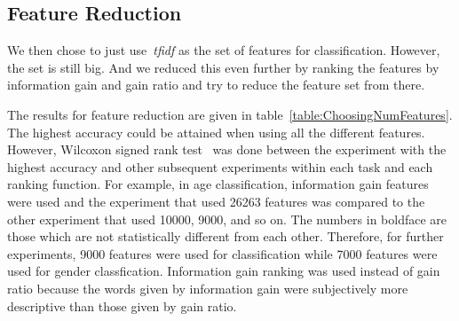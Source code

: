 \documentclass[a4paper]{llncs}
\begin{document}
\subsection{Feature Reduction}
We then chose to just use~\textit{tfidf} as the set of features for classification. However, the set is still big. And we reduced this even further by ranking the features by information gain and gain ratio and try to reduce the feature set from there.  

The results for feature reduction are given in table~\ref{table:ChoosingNumFeatures}. The highest accuracy could be attained when using all the different features. However, Wilcoxon signed rank test~\cite{wilcoxon1945individual} was done between the experiment with the highest accuracy and other subsequent experiments within each task and each ranking function. For example, in age classification, information gain features were used and the experiment that used 26263 features was compared to the other experiment that used 10000, 9000, and so on. The numbers in boldface are those which are not statistically different from each other. Therefore, for further experiments, 9000 features were used for classification while 7000 features were used for gender classfication. Information gain ranking was used instead of gain ratio because the words given by information gain were subjectively more descriptive than those given by gain ratio. 
\end{document}
